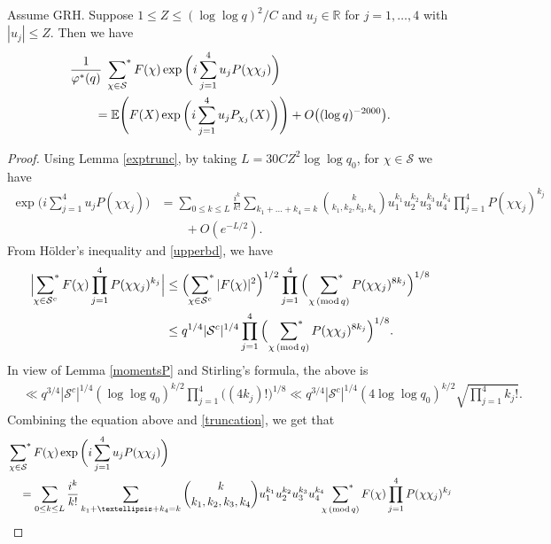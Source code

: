 \documentclass[10pt,a4paper]{amsart}
\def\sumstar{\sideset{}{^*}\sum}
\newcommand{\E}{\mathbb{E}}
\renewcommand{\pmod}[1]{\,(\mathrm{mod}\,#1)}
\begin{document}
\begin{lemma}
\label{random_chi}
Assume GRH. Suppose $1\leq Z \leq (\log\log q)^2/C$ and $u_j \in \mathbb{R}$ for $j=1,\ldots, 4$ with $|u_j| \leq Z$. Then we have 
\begin{align*}
   & \frac{1}{\varphi^{*}(q)}\ \sumstar_{\chi \in \mathcal{S}} F(\chi)  
\exp\bigg(  i\sum_{j=1}^4 u_jP(\chi\chi_j)\bigg) \\
&\qquad= \E \Bigg( F(X) \exp\bigg(  i\sum_{j=1}^4 u_jP_{\chi_j}(X)\bigg)\Bigg) +O\big(  (\log q)^{-2000}\big).
\end{align*}
\end{lemma}

\begin{proof}
    
Using Lemma \ref{exptrunc}, by taking $L= 30CZ^2 \log \log q_0$, for $\chi \in \mathcal{S}$ we have 
    \begin{align} \label{truncation}
    \exp\bigg(  i\sum_{j=1}^4 u_jP(\chi\chi_j)\bigg)& = \sum_{0 \leq k \leq L} \frac{i^k}{k!} \sum_{k_1+\ldots +k_4=k} {k \choose k_1,k_2,k_3,k_4} u_1^{k_1} u_2^{k_2} u_3^{k_3} u_4^{k_4} \prod_{j=1}^4 P(\chi \chi_j)^{k_j}\\
    &\qquad+O(e^{-L/2}).\nonumber
    \end{align}
 From H\"older's inequality and \eqref{upperbd}, we have
\begin{align*}
 \Big|\sumstar_{\chi \in \mathcal{S}^c} F(\chi)  \prod_{j=1}^4 P(\chi \chi_j)^{k_j} \Big| &\leq \Big( \sumstar_{\chi \in \mathcal{S}^c} |F(\chi)|^2 \Big)^{1/2} \prod_{j=1}^4 \Big(\ \sumstar_{\chi \pmod q} P(\chi \chi_j)^{8k_j} \Big)^{1/8}  \\
 & \leq q^{1/4} |\mathcal{S}^c|^{1/4} \prod_{j=1}^4 \Big(\ \sumstar_{\chi \pmod q} P(\chi \chi_j)^{8k_j} \Big)^{1/8}.
\end{align*}  
In view of Lemma \ref{momentsP} and Stirling's formula, the above is 
\begin{align*}
    & \ll q^{3/4} |\mathcal{S}^c|^{1/4}(\log\log q_0)^{k/2} \prod_{j=1}^4  \big((4k_j)!\big)^{1/8}  \ll q^{3/4} |\mathcal{S}^c|^{1/4} (4 \log \log q_0)^{k/2} \sqrt{ \prod_{j=1}^4k_j!}.
\end{align*}
Combining the equation above and \eqref{truncation}, we get that 
\begin{align*}
 &   \sumstar_{\chi \in \mathcal{S}}  F(\chi)  
\exp\bigg(  i\sum_{j=1}^4 u_jP(\chi\chi_j)\bigg) \\
&\quad= \sum_{0 \leq k \leq L} \frac{i^k}{k!} \sum_{k_1+\ldots +k_4=k} {k \choose k_1,k_2,k_3,k_4} u_1^{k_1} u_2^{k_2} u_3^{k_3} u_4^{k_4} \sumstar_{\chi \pmod q} F(\chi)  \prod_{j=1}^4 P(\chi \chi_j)^{k_j}\\

\end{align*}
\end{proof}
\end{document}
